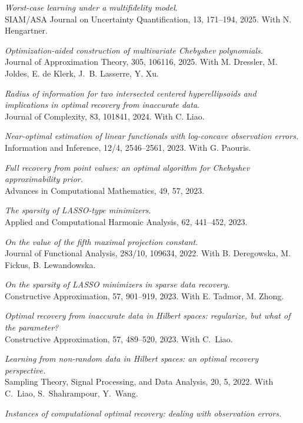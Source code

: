 \documentclass[11pt]{article}
\begin{document}
\item {\sl Worst-case learning under a multifidelity model}.\\
SIAM/ASA Journal on Uncertainty Quantification, 13, 171--194, 2025. With N. Hengartner.
\item {\sl Optimization-aided construction of multivariate Chebyshev polynomials}.\\
Journal of Approximation Theory, 305, 106116, 2025. With M.  Dressler, M.  Joldes, E. de Klerk, J.~B. Lasserre,  Y. Xu.
\item {\sl Radius of information for two intersected centered hyperellipsoids and implications in optimal recovery from inaccurate data}. \\
Journal of Complexity, 83, 101841, 2024. With C. Liao.
\item {\sl Near-optimal estimation of linear functionals with log-concave observation errors.}\\
Information and Inference, 12/4, 2546--2561, 2023.  
With G. Paouris.
\item {\sl Full recovery from point values: an optimal algorithm for Chebyshev approximability prior.}\\
Advances in Computational Mathematics,  49, 57, 2023.	
\item {\sl The sparsity of LASSO-type minimizers.}\\
Applied and Computational Harmonic Analysis, 62, 441--452, 2023.
\item {\sl On the value of the fifth maximal projection constant.}\\
Journal of Functional Analysis, 283/10, 109634, 2022.
With B. Deregowska, M. Fickus,  B. Lewandowska.
\item {\sl On the sparsity of LASSO minimizers in sparse data recovery.}\\
Constructive Approximation, 57, 901--919, 2023. With E. Tadmor, M.  Zhong.
\item {\sl Optimal recovery from inaccurate data in Hilbert spaces: regularize, but what of the parameter?}\\
Constructive Approximation, 57, 489--520, 2023.  With C.~Liao.
\item {\sl Learning from non-random data in Hilbert spaces: an optimal recovery perspective.}\\
Sampling Theory, Signal Processing, and Data Analysis,
20, 5, 2022.
With C.~Liao, S.~Shahrampour, Y.~Wang. 
\item {\sl Instances of computational optimal recovery: dealing with observation errors.}\\
\end{document}
